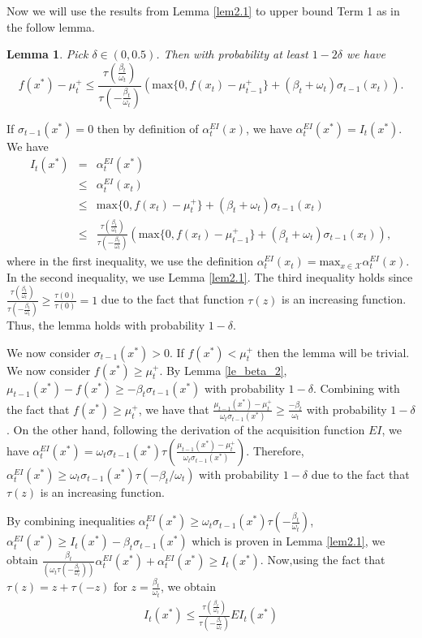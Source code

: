 \documentclass[twoside]{article}
\newtheorem{lemma}{Lemma}
\newenvironment{proof*}[1][\proofname]{
  \renewcommand\qedsymbol{\rule{2.5mm}{2.5mm}}
  \begin{proof}[#1]}{\end{proof}}
\begin{document}
Now we will use the results from Lemma \ref{lem2.1} to upper bound Term 1 as in the follow lemma.
\begin{lemma}
Pick $\delta \in (0,0.5)$. Then with probability at least $1 -2\delta$ we have
$$ f(x^*) - \mu_{t}^+ \le  \frac{\tau(\frac{\beta_t}{\omega_t})}{ \tau(-\frac{\beta_t}{\omega_t})}( \text{max}\{0, f(x_{t}) - \mu_{t-1}^+\} + (\beta_t + \omega_t)\sigma_{t-1}(x_{t})).$$ \label{lem2.2}
\end{lemma}
\begin{proof*}
If $\sigma_{t-1}(x^*) = 0$ then by definition of $\alpha_t^{EI} (x)$, we have  $\alpha_t^{EI} (x^*) = I_t(x^*)$.  We have
\begin{eqnarray*}
I_t(x^*) & = & \alpha^{EI}_t(x^*) \\
& \le & \alpha^{EI}_t(x_{t}) \\
& \le &  \text{max} \{0, f(x_{t})- \mu^+_{t}\} + (\beta_t + \omega_t)\sigma_{t-1}(x_{t}) \\
& \le & \frac{\tau(\frac{\beta_t}{\omega_t})}{ \tau(-\frac{\beta_t}{\omega_t})}( \text{max}\{0, f(x_{t}) - \mu_{t-1}^+\} + (\beta_t + \omega_t)\sigma_{t-1}(x_{t})),
\end{eqnarray*}
where in the first inequality, we use the definition $\alpha^{EI}_t(x_{t}) = \text{max}_{x \in \mathcal X} \alpha^{EI}_t(x)$. In the second inequality, we use Lemma \ref{lem2.1}. The third inequality holds since $\frac{\tau(\frac{\beta_t}{\omega_t})}{ \tau(-\frac{\beta_t}{\omega_t})} \ge \frac{\tau(0)}{\tau(0)} = 1$ due to the fact that function $\tau(z)$ is an increasing function. Thus, the lemma holds with probability $1 - \delta$.

We now consider $\sigma_{t-1}(x^*) >0$. If $f(x^*) < \mu_{t}^+$ then the lemma will be trivial. We now consider $f(x^*) \ge \mu_{t}^+$. By Lemma \ref{le_beta_2}, $\mu_{t-1}(x^*) - f(x^*) \ge -\beta_t \sigma_{t-1}(x^*)$ with probability $ 1 -\delta$. Combining with the fact that $f(x^*) \ge \mu_{t}^+$, we have that $\frac{\mu_{t-1}(x^*) - \mu^+_{t}}{\omega_t  \sigma_{t-1}(x^*)} \ge \frac{-\beta_t}{\omega_t}$  with probability $ 1 -\delta$. On the other hand, following the derivation of the acquisition function $EI$, we have $\alpha_t^{EI}(x^*) = \omega_t  \sigma_{t-1}(x^*) \tau(\frac{\mu_{t-1}(x^*) - \mu^+_{t}}{\omega_t  \sigma_{t-1}(x^*)})$. Therefore, $\alpha_t^{EI}(x^*) \ge \omega_t \sigma_{t-1}(x^*) \tau(-\beta_t/\omega_t)$ with probability $ 1 -\delta$ due to the fact that $\tau(z)$ is an increasing function.

By combining inequalities $\alpha_t^{EI}(x^*) \ge \omega_t \sigma_{t-1}(x^*) \tau(-\frac{\beta_t}{\omega_t})$, $\alpha_t^{EI}(x^*) \ge I_t(x^*) -  \beta_t \sigma_{t-1}(x^*)$ which is proven in Lemma \ref{lem2.1}, we obtain $ \frac{\beta_t}{(\omega_t\tau(-\frac{\beta_t}{\omega_t}))}\alpha_t^{EI}(x^*) + \alpha_t^{EI}(x^*) \ge I_t(x^*)$. Now,using the fact that $\tau(z) = z + \tau(-z)$ for $z =  \frac{\beta_t}{\omega_t}$, we obtain
\begin{eqnarray}
I_t(x^*) \le \frac{\tau(\frac{\beta_t}{\omega_t})}{ \tau(-\frac{\beta_t}{\omega_t})}EI_{t}(x^*)
\label{eq2.1}
\end{eqnarray}


\end{proof*}
\end{document}
